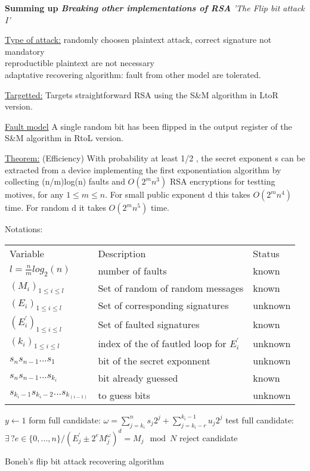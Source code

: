 \textbf{Summing up \textit{ Breaking other implementations of RSA}} 
\textit{'The Flip bit attack I'}

\underline{Type of attack:}
randomly choosen plaintext attack, correct signature not mandatory\\
reproductible plaintext are not necessary\\
adaptative recovering algorithm: fault from other model are tolerated.

\underline{Targetted:}
Targets straightforward RSA using the S\&M algorithm in LtoR version.
		
\underline{Fault model}
A single random bit has been flipped in the output register of the
S\&M algorithm in RtoL version.
 
\underline{Theorem:} (Efficiency)
 With probability at least 1/2 , the secret exponent s can be extracted
from a device implementing the first exponentiation algorithm by collecting
(n/m)log(n) faults and $O(2^m n^3 )$ RSA encryptions for testting motives, 
for any $1 \leq m \leq n$. For small public exponent d this takes $O(2^m n^4 )$ time. 
For random d it takes $O(2^m n^5 )$ time.

Notations:	\\
\begin{tabularx}{\linewidth}{ p{6cm} p{7.5cm} l}
	Variable & Description & Status\\ 
	$ l = \frac{n}{m} log_2(n)$ & number of faults & known\\
	$(M_i)_{1 \leq  i \leq l}$ & Set of random of random messages & known\\ 
	$(E_i)_{1 \leq  i \leq l}$ & Set of corresponding signatures & unknown\\ 
	$(E^{'}_i)_{1 \leq  i \leq l}$ & Set of faulted signatures & known\\ 
	$(k_i)_{1 \leq  i \leq l}$ & index of the of fautled loop for $E^{'}_i$ & unknown\\
    $ s_n s_{n-1} ... s_{1}$ & bit of the secret exponnent & unknown\\
    $ s_n s_{n-1} ... s_{k_i} $ & bit already guessed  & known\\
    $ s_{k_i-1} s_{k_i-2} ... s_{k_{(i-1)}} $ & to guess bits  & unknown\\    
\end{tabularx}	

	\begin{algorithm}[h]
		$y \leftarrow 1$	\;	
		{			 
			{	
			\textsf{form full candidate: }		 
			 $\omega = \sum \limits_{j=k_i}^{n}       s_j 2^j +
			           \sum \limits_{j=k_i-r}^{k_i-1} u_j 2^j $\; 
			\textsf{test full candidate: }		  
			 	$\exists \, ? e \in \{0, ... ,n\} / (E^{'}_j \pm 2^e M_j^\omega)^d = M_j \mod N$\;
 			  {reject candidate}		 		
			}		
		}									 
		\caption{Boneh's flip bit attack recovering algorithm}
	\end{algorithm}
	
